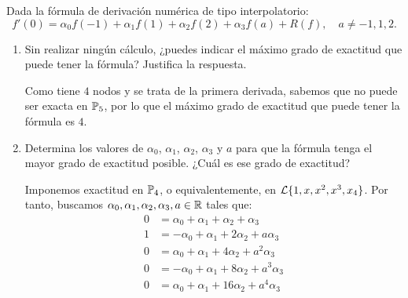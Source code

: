 \begin{ejercicio}\label{ej:2.2.6}
    Dada la fórmula de derivación numérica de tipo interpolatorio:
    \[
    f'(0) = \alpha_0 f(-1) + \alpha_1 f(1) + \alpha_2 f(2) + \alpha_3 f(a) + R(f), \quad a \neq -1, 1, 2.
    \]
    \begin{enumerate}
        \item Sin realizar ningún cálculo, ¿puedes indicar el máximo grado de exactitud que puede tener la fórmula? Justifica la respuesta.
        
        Como tiene $4$ nodos y se trata de la primera derivada, sabemos que no puede ser exacta en $\mathbb{P}_5$, por lo que el máximo grado de exactitud que puede tener la fórmula es $4$.
        
        \item Determina los valores de $\alpha_0$, $\alpha_1$, $\alpha_2$, $\alpha_3$ y $a$ para que la fórmula tenga el mayor grado de exactitud posible. ¿Cuál es ese grado de exactitud?
        
        Imponemos exactitud en $\mathbb{P}_4$, o equivalentemente, en $\mathcal{L}\{1, x, x^2,x^3,x_4\}$. Por tanto, buscamos $\alpha_0,\alpha_1,\alpha_2,\alpha_3, a\in\mathbb{R}$ tales que:
        \begin{align*}
            0 &= \alpha_0 + \alpha_1 + \alpha_2 + \alpha_3 \\
            1 &= -\alpha_0 + \alpha_1 + 2\alpha_2 + a\alpha_3 \\
            0 &= \alpha_0 + \alpha_1 + 4\alpha_2 + a^2\alpha_3 \\
            0 &= -\alpha_0 + \alpha_1 + 8\alpha_2 + a^3\alpha_3 \\
            0 &= \alpha_0 + \alpha_1 + 16\alpha_2 + a^4\alpha_3
        \end{align*}


\end{enumerate}
\end{ejercicio}
